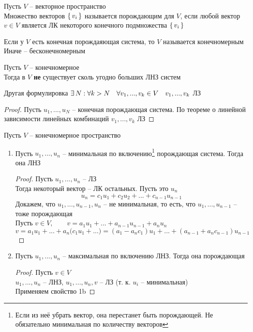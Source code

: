 \begin{definition}
    Пусть $V$ -- векторное пространство \\
    Множество векторов $ \set{v_i}$ называется порождающим для $V$, если любой вектор $v \in V$ является ЛК некоторого конечного подмножества $\set{v_i}$
\end{definition}

\begin{definition}
	Если у $V$ есть конечная порождаяющая система, то $V$ называется конечномерным \\
    Иначе -- бесконечномерным
\end{definition}

\begin{property}
	Пусть $V$ -- конечномерное \\
    Тогда в $V$ \textbf{не} существует сколь угодно больших ЛНЗ систем
\end{property}

\begin{undefthm}{Другая формулировка}
	$ \exists\, N : \forall k > N \quad \forall v_1, ..., v_k \in V \quad v_1, ..., v_k$ ЛЗ
\end{undefthm}

\begin{proof}
	Пусть $u_1, ..., u_N$ -- конечная порождающая система. По теореме о линейной зависимости линейных комбинаций $v_1, ..., v_k$ ЛЗ
\end{proof}

\begin{theorem}
	Пусть $V$ -- конечномерное пространство
    \begin{enumerate}
        \item Пусть $u_1, ..., u_n$ -- минимальная по включению\footnote{Если из неё убрать вектор, она перестанет быть порождающей. Не обязательно минимальная по количеству векторов} порождающая система. Тогда она ЛНЗ
        \begin{proof}
        	Пусть $u_1, ..., u_n$ -- ЛЗ \\
            Тогда некоторый вектор -- ЛК остальных. Пусть это $u_n$
            $$ u_n = c_1u_1 + c_2u_2 + ... + c_{n - 1}u_{n - 1} $$
            Докажем, что $u_1, ..., u_{n - 1}, u_n$ -- не минимальная, то есть, что $u_1, ..., u_{n - 1}$ -- тоже порождающая \\
            Пусть $v \in V, \qquad v = a_1u_1 + ... + a_{n - 1}u_{n - 1} + a_nu_n $
            $$ v = a_1u_1 + ... + a_n \bigg( c_1u_1 + ... \bigg) = (a_1 - a_nc_1)u_1 + ... + (a_{n - 1} + a_nc_{n - 1})u_{n - 1} $$
        \end{proof}
        \item Пусть $u_1, ..., u_n$ -- максимальная по включению ЛНЗ. Тогда она порождающая
        \begin{proof}
        	Пусть $v \in V$ \\
            $u_1, ..., u_n$ -- ЛНЗ, $u_1, ..., u_n, v$ -- ЛЗ (т. к. $u_i$ -- минимальная) \\
            Применяем свойство 1b
        \end{proof}
    \end{enumerate}
\end{theorem}

